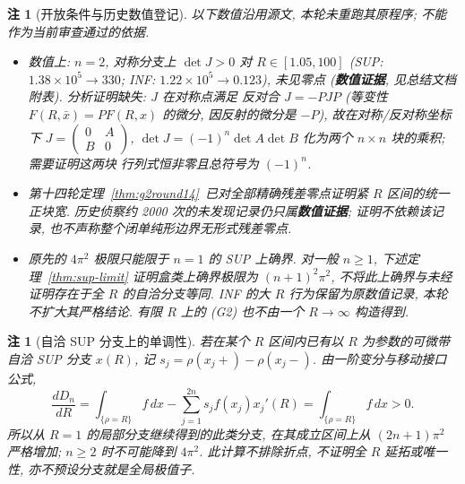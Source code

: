 \documentclass[UTF8]{ctexart}
\newtheorem{remark}[theorem]{注}
\newcommand{\EVIDENCE}{\textbf{数值证据}}
\begin{document}
\begin{remark}[开放条件与历史数值登记]
以下数值沿用源文, 本轮未重跑其原程序; 不能作为当前审查通过的依据.
\begin{itemize}
	\item[(G1$'$)] 数值上: $n=2$, 对称分支上 $\det J>0$ 对
	$R\in[1.05,100]$ (SUP: $1.38\times10^5\to330$; INF: $1.22\times10^5\to0.123$),
	未见零点 (\EVIDENCE, 见总结文档附表). 分析证明缺失: $J$ 在对称点满足
	反对合 $J=-PJP$ (等变性 $F(R,\bar x)=PF(R,x)$ 的微分, 因反射的微分是
	$-P$), 故在对称/反对称坐标下 $J=\begin{pmatrix}0&A\\B&0\end{pmatrix}$,
	$\det J=(-1)^n\det A\det B$ 化为两个 $n\times n$ 块的乘积; 需要证明这两块
	行列式恒非零且总符号为 $(-1)^n$.
	\item[(G2)] 第十四轮定理~\ref{thm:g2round14}~已对全部精确残差零点证明紧
	$R$ 区间的统一正块宽. 历史侦察约 2000 次的未发现记录仍只属\EVIDENCE;
	证明不依赖该记录, 也不声称整个闭单纯形边界无形式残差零点.
	\item 原先的 $4\pi^2$ 极限只能限于 $n=1$ 的 SUP 上确界.
	对一般 $n\ge1$, 下述定理~\ref{thm:sup-limit} 证明盒类上确界极限为
	$(n+1)^2\pi^2$, 不将此上确界与未经证明存在于全 $R$ 的自洽分支等同.
	INF 的大 $R$ 行为保留为原数值记录, 本轮不扩大其严格结论.
	有限 $R$ 上的 (G2) 也不由一个 $R\to\infty$ 构造得到.
\end{itemize}
\end{remark}

\begin{remark}[自洽 SUP 分支上的单调性]\label{rem:sup-branch}
若在某个 $R$ 区间内已有以 $R$ 为参数的可微带自洽 SUP 分支 $x(R)$,
记 $s_j=\rho(x_j+)-\rho(x_j-)$. 由一阶变分与移动接口公式,
\begin{equation*}
\frac{dD_n}{dR}=\int_{\{\rho=R\}}f\,dx-
\sum_{j=1}^{2n}s_j f(x_j)x_j'(R)=\int_{\{\rho=R\}}f\,dx>0.
\end{equation*}
所以从 $R=1$ 的局部分支继续得到的此类分支, 在其成立区间上从
$(2n+1)\pi^2$ 严格增加; $n\ge2$ 时不可能降到 $4\pi^2$.
此计算不排除折点, 不证明全 $R$ 延拓或唯一性, 亦不预设分支就是全局极值子.
\end{remark}
\end{document}

